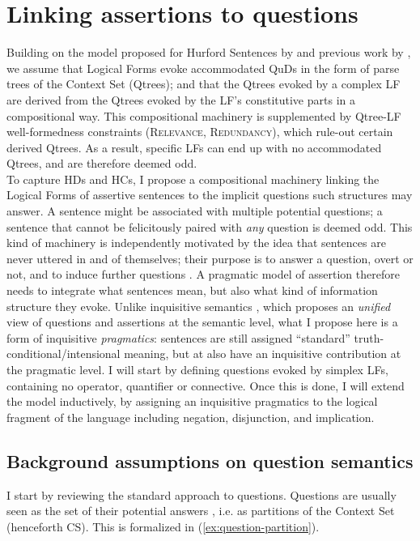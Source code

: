 \section{Linking assertions to questions}\label{sec:machinery}


Building on the model proposed for Hurford Sentences by \citet{HenotMortier2024} and previous work by \cite{Zhang2024,Haslinger2023}, we assume that Logical Forms evoke accommodated QuDs in the form of parse trees of the Context Set (Qtrees); and that the Qtrees evoked by a complex LF are derived from the Qtrees evoked by the LF's constitutive parts in a compositional way. This compositional machinery is supplemented by Qtree-LF well-formedness constraints (\textsc{Relevance}, \textsc{Redundancy}), which rule-out certain derived Qtrees. As a result, specific LFs can end up with no accommodated Qtrees, and are therefore deemed odd.\\


To capture HDs and HCs, I propose a compositional machinery linking the Logical Forms of assertive sentences to the implicit questions such structures may answer. A sentence might be associated with multiple potential questions; a sentence that cannot be felicitously paired with \textit{any} question is deemed odd. This kind of machinery is independently motivated by the idea that sentences are never uttered in and of themselves; their purpose is to answer a question, overt or not, and to induce further questions \cite{Roberts1996}. A pragmatic model of assertion therefore needs to integrate what sentences mean, but also what kind of information structure they evoke. Unlike inquisitive semantics \citep{Mascarenhas2008,Ciardelli2009,Groenendijk2009,Ciardelli2018}, which proposes an \textit{unified} view of questions and assertions at the semantic level, what I propose here is a form of inquisitive \textit{pragmatics}: sentences are still assigned ``standard'' truth-conditional/intensional meaning, but at also have an inquisitive contribution at the pragmatic level. I will start by defining questions evoked by simplex LFs, containing no operator, quantifier or connective. Once this is done, I will extend the model inductively, by assigning an inquisitive pragmatics to the logical fragment of the language including negation, disjunction, and implication.
\subsection{Background assumptions on question semantics}
I start by reviewing the standard approach to questions. Questions are usually seen as the set of their potential answers \cite{Hamblin1973}, i.e. as partitions of the Context Set (henceforth CS). This is formalized in (\ref{ex:question-partition}).

